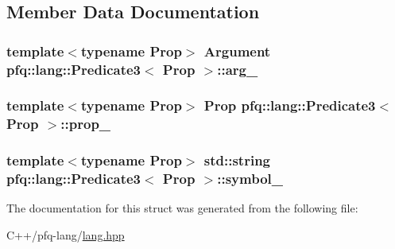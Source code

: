 \subsection{Member Data Documentation}
\hypertarget{structpfq_1_1lang_1_1Predicate3_a5e5d800f6e5b70071015e5be58e77778}{
\subsubsection[{arg\+\_\+}]{\setlength{\rightskip}{0pt plus 5cm}template$<$typename Prop$>$ {\bf Argument} {\bf pfq\+::lang\+::\+Predicate3}$<$ Prop $>$\+::arg\+\_\+}}\label{structpfq_1_1lang_1_1Predicate3_a5e5d800f6e5b70071015e5be58e77778}
\hypertarget{structpfq_1_1lang_1_1Predicate3_af8363ba6bc8746cdf6b2b180f56f2e27}{
\subsubsection[{prop\+\_\+}]{\setlength{\rightskip}{0pt plus 5cm}template$<$typename Prop$>$ Prop {\bf pfq\+::lang\+::\+Predicate3}$<$ Prop $>$\+::prop\+\_\+}}\label{structpfq_1_1lang_1_1Predicate3_af8363ba6bc8746cdf6b2b180f56f2e27}
\hypertarget{structpfq_1_1lang_1_1Predicate3_a118f41c3c92a3d0167a6730f26266799}{
\subsubsection[{symbol\+\_\+}]{\setlength{\rightskip}{0pt plus 5cm}template$<$typename Prop$>$ std\+::string {\bf pfq\+::lang\+::\+Predicate3}$<$ Prop $>$\+::symbol\+\_\+}}\label{structpfq_1_1lang_1_1Predicate3_a118f41c3c92a3d0167a6730f26266799}


The documentation for this struct was generated from the following file\+:\begin{DoxyCompactItemize}
\item 
C++/pfq-\/lang/\hyperlink{lang_8hpp}{lang.\+hpp}\end{DoxyCompactItemize}
